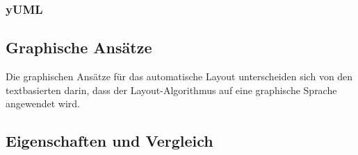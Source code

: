 

\subsubsection{yUML}


\subsection{Graphische Ansätze}
\label{subsec:automatic-layout-graphical-approaches}

Die graphischen Ansätze für das automatische Layout unterscheiden sich von den textbasierten darin, dass der Layout-Algorithmus auf eine graphische Sprache angewendet wird.










\subsection{Eigenschaften und Vergleich}


